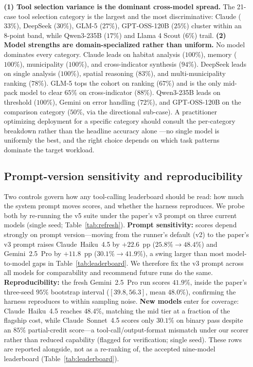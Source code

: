 \documentclass[sigconf]{acmart}
\begin{document}
\textbf{(1) Tool selection variance is the dominant cross-model spread.} The 21-case tool selection category is the largest and the most discriminative: Claude ($33\%$), DeepSeek ($30\%$), GLM-5 ($27\%$), GPT-OSS-120B ($25\%$) cluster within an 8-point band, while Qwen3-235B ($17\%$) and Llama 4 Scout ($6\%$) trail. \textbf{(2) Model strengths are domain-specialized rather than uniform.} No model dominates every category. Claude leads on habitat analysis ($100\%$), memory ($100\%$), municipality ($100\%$), and cross-indicator synthesis ($94\%$). DeepSeek leads on single analysis ($100\%$), spatial reasoning ($83\%$), and multi-municipality ranking ($78\%$). GLM-5 tops the cohort on ranking ($67\%$) and is the only mid-pack model to clear $65\%$ on cross-indicator ($88\%$). Qwen3-235B leads on threshold ($100\%$), Gemini on error handling ($72\%$), and GPT-OSS-120B on the comparison category ($50\%$, via the directional sub-case). A practitioner optimizing deployment for a specific category should consult the per-category breakdown rather than the headline accuracy alone ---no single model is uniformly the best, and the right choice depends on which task patterns dominate the target workload.


\subsection{Prompt-version sensitivity and reproducibility}
\label{sec:prompt}
\label{sec:refresh}

Two controls govern how any tool-calling leaderboard should be read: how much the system prompt moves scores, and whether the harness reproduces. We probe both by re-running the v5 suite under the paper's v3 prompt on three current models (single seed; Table~\ref{tab:refresh}). \textbf{Prompt sensitivity:} scores depend strongly on prompt version---moving from the runner's default (v2) to the paper's v3 prompt raises Claude~Haiku~4.5 by $+22.6$~pp ($25.8\%\!\to\!48.4\%$) and Gemini~2.5~Pro by $+11.8$~pp ($30.1\%\!\to\!41.9\%$), a swing larger than most model-to-model gaps in Table~\ref{tab:leaderboard}. We therefore fix the v3 prompt across all models for comparability and recommend future runs do the same. \textbf{Reproducibility:} the fresh Gemini~2.5~Pro run scores $41.9\%$, inside the paper's three-seed $95\%$ bootstrap interval ($[39.8, 56.3]$, mean $48.0\%$), confirming the harness reproduces to within sampling noise. \textbf{New models} enter for coverage: Claude~Haiku~4.5 reaches $48.4\%$, matching the mid tier at a fraction of the flagship cost, while Claude~Sonnet~4.5 scores only $30.1\%$ on binary pass despite an $85\%$ partial-credit score---a tool-call/output-format mismatch under our scorer rather than reduced capability (flagged for verification; single seed). These rows are reported alongside, not as a re-ranking of, the accepted nine-model leaderboard (Table~\ref{tab:leaderboard}).
\end{document}
